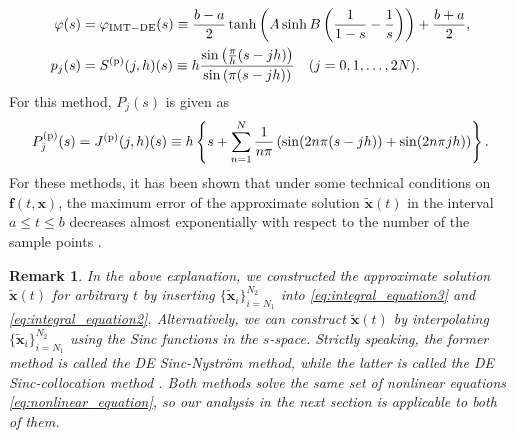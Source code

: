 \documentclass[pdflatex,sn-mathphys-num]{sn-jnl}%
\theoremstyle{thmstyleone}%
\theoremstyle{thmstyletwo}%
\newtheorem{remark}{Remark}%
\theoremstyle{thmstylethree}%
\begin{document}
\begin{align}
\varphi(s) &= \varphi_{\rm IMT-DE}(s) \equiv \frac{b-a}{2}\tanh\left(A\sinh B\left(\frac{1}{1-s}-\frac{1}{s}\right)\right)+\frac{b+a}{2}, \label{eq:IMT-DE} \\
p_j(s) &= S^{({\rm p})}(j,h)(s) \equiv h\frac{\sin\left(\frac{\pi}{h}(s-jh)\right)}{\sin\left(\pi(s-jh)\right)} \quad (j=0, 1, \ldots, 2N). \label{eq:psinc}
\end{align}
For this method, $P_j(s)$ is given as
\begin{equation}
P_j^{({\rm p})}(s) = J^{({\rm p})}(j,h)(s) \equiv h\left\{s+\sum_{n=1}^N\frac{1}{n\pi}\left(\sin(2n\pi(s-jh))+\sin(2n\pi jh)\right)\right\}. \label{eq:Pjps}
\end{equation}
For these methods, it has been shown that under some technical conditions on ${\bm f}(t,{\bm x})$, the maximum error of the approximate solution $\widetilde{\bm x}(t)$ in the interval $a\le t\le b$ decreases almost exponentially with respect to 
the number of the sample points \cite{Okayama18,Ogata23}.

\begin{remark}
In the above explanation, we constructed the approximate solution $\widetilde{\bm x}(t)$ for arbitrary $t$ by inserting $\{\widetilde{\bm x}_i\}_{i=N_1}^{N_2}$ into \eqref{eq:integral_equation3} and \eqref{eq:integral_equation2}. Alternatively, we can construct $\widetilde{\bm x}(t)$ by interpolating $\{\widetilde{\bm x}_i\}_{i=N_1}^{N_2}$ using the Sinc functions in the $s$-space. Strictly speaking, the former method is called the DE Sinc-Nystr\"{o}m method, while the latter is called the DE Sinc-collocation method \cite{Okayama18}. Both methods solve the same set of nonlinear equations \eqref{eq:nonlinear_equation}, so our analysis in the next section is applicable to both of them.
\end{remark}
\end{document}
